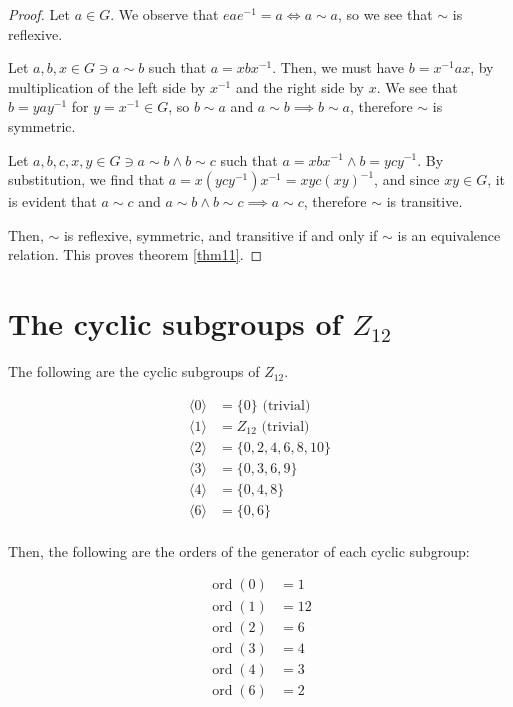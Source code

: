 \documentclass[12pt]{article}
\newcommand{\ord}{\operatorname{ord}}
\begin{document}
\begin{proof}
	Let $a \in G$.
	We observe that $eae^{-1} = a \iff a \sim a$,
	so we see that
	$\sim$ is reflexive.

	Let $a,b,x \in G \ni a \sim b$
	such that $a = xbx^{-1}$.
	Then, we must have $b = x^{-1}ax$,
	by multiplication of the left side by $x^{-1}$
	and the right side by $x$.
	We see that $b = yay^{-1}$ for $y = x^{-1} \in G$,
	so $b \sim a$ and $a \sim b \implies b \sim a$,
	therefore $\sim$ is symmetric.

	Let $a,b,c,x,y \in G \ni a \sim b \land b \sim c$
	such that $a = xbx^{-1} \land b = ycy^{-1}$.
	By substitution, we find that
	$a = x(ycy^{-1})x^{-1} = xyc(xy)^{-1}$,
	and since $xy \in G$, it is evident that
	$a \sim c$ and $a \sim b \land b \sim c \implies a \sim c$,
	therefore $\sim$ is transitive.

	Then,
	$\sim$ is
	reflexive,
	symmetric,
	and transitive
	if and only if
	$\sim$ is an equivalence relation.
	This proves theorem \ref{thm11}.
\end{proof}

\section{The cyclic subgroups of $Z_{12}$}

The following are the cyclic subgroups of $Z_{12}$.

\begin{align}
	\langle 0 \rangle & = \{0\} \text{ (trivial)} \\
	\langle 1 \rangle & = Z_{12} \text{ (trivial)} \\
	\langle 2 \rangle & = \{0, 2, 4, 6, 8, 10 \} \\
	\langle 3 \rangle & = \{0, 3, 6, 9 \} \\
	\langle 4 \rangle & = \{0, 4, 8 \} \\
	\langle 6 \rangle & = \{0, 6 \} \\
\end{align}

Then, the following are the orders of the generator of each cyclic subgroup:

\begin{align}
	\ord(0) & = 1 \\
	\ord(1) & = 12 \\
	\ord(2) & = 6 \\
	\ord(3) & = 4 \\
	\ord(4) & = 3 \\
	\ord(6) & = 2
\end{align}
\end{document}

